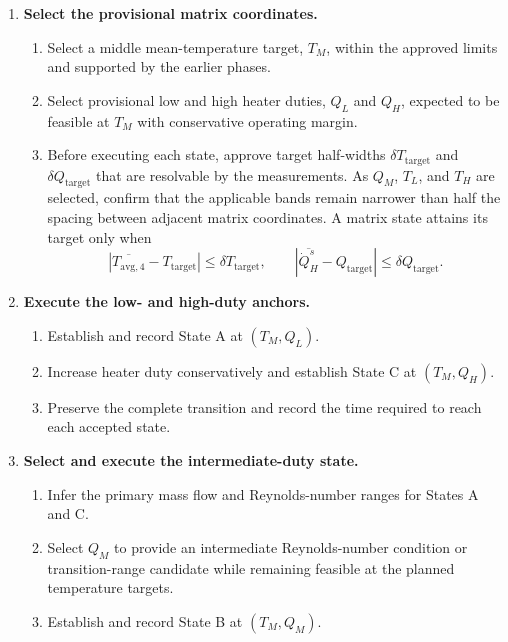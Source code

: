 \documentclass[11pt]{article}
\newcommand{\Tavg}{T_{\mathrm{avg},4}}
\newcommand{\QHs}{\dot Q_{H}^{s}}
\begin{document}
\begin{enumerate}
    \item \textbf{Select the provisional matrix coordinates.}
    \begin{enumerate}
        \item Select a middle mean-temperature target, $T_M$, within the approved limits and supported by the earlier phases.
        \item Select provisional low and high heater duties, $Q_L$ and $Q_H$, expected to be feasible at $T_M$ with conservative operating margin.
        \item Before executing each state, approve target half-widths $\delta T_{\mathrm{target}}$ and $\delta Q_{\mathrm{target}}$ that are resolvable by the measurements. As $Q_M$, $T_L$, and $T_H$ are selected, confirm that the applicable bands remain narrower than half the spacing between adjacent matrix coordinates. A matrix state attains its target only when
        \begin{equation}
            |\overline{\Tavg}-T_{\mathrm{target}}|\leq\delta T_{\mathrm{target}},
            \qquad
            |\overline{\QHs}-Q_{\mathrm{target}}|\leq\delta Q_{\mathrm{target}}.
            \label{eq:target_bands}
        \end{equation}
    \end{enumerate}

    \item \textbf{Execute the low- and high-duty anchors.}
    \begin{enumerate}
        \item Establish and record State A at $(T_M,Q_L)$.
        \item Increase heater duty conservatively and establish State C at $(T_M,Q_H)$.
        \item Preserve the complete transition and record the time required to reach each accepted state.
    \end{enumerate}

    \item \textbf{Select and execute the intermediate-duty state.}
    \begin{enumerate}
        \item Infer the primary mass flow and Reynolds-number ranges for States A and C.
        \item Select $Q_M$ to provide an intermediate Reynolds-number condition or transition-range candidate while remaining feasible at the planned temperature targets.
        \item Establish and record State B at $(T_M,Q_M)$.
    \end{enumerate}


\end{enumerate}
\end{document}
